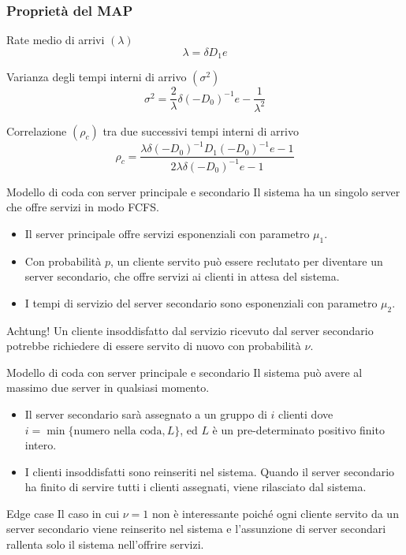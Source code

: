 \documentclass{beamer}
\begin{document}
\begin{frame}
    \frametitle{Proprietà del MAP}
        \begin{block}{Rate medio di arrivi $(\lambda)$}
            $$ \lambda = \delta D_1 e$$
        \end{block}
        \begin{block}{Varianza degli tempi interni di arrivo $(\sigma^2)$}
            $$ \sigma^2 = \frac{2}{\lambda} \delta (-D_0)^{-1} e - \frac{1}{\lambda^2}$$
        \end{block}
        \begin{block}{Correlazione $(\rho_c)$ tra due successivi tempi interni di arrivo}
            $$ \rho_c = \frac{\lambda \delta (-D_0)^{-1} D_1 (-D_0)^{-1} e - 1}{2 \lambda \delta (-D_0)^{-1} e - 1}$$
        \end{block}
\end{frame}

\begin{frame}{Modello di coda con server principale e secondario}
    Il sistema ha un singolo server che offre servizi in modo FCFS.
    \begin{itemize}
        \item Il server principale offre servizi esponenziali con parametro $\mu_1$.
        \item  Con probabilità $p$, un cliente servito può essere reclutato per diventare un server secondario, che offre servizi ai clienti in attesa del sistema.
        \item I tempi di servizio del server secondario sono esponenziali con parametro $\mu_2$.
    \end{itemize}
    \begin{block}{Achtung!}
        Un cliente insoddisfatto dal servizio ricevuto dal server secondario potrebbe richiedere di essere servito di nuovo con probabilità $\nu$.
    \end{block}
\end{frame}


\begin{frame}{Modello di coda con server principale e secondario}
    Il sistema può avere al massimo due server in qualsiasi momento.
    \begin{itemize}
        \item Il server secondario sarà assegnato a un gruppo di $i$ clienti dove $i = \min \{\text{numero nella coda}, L\}$, ed $L$ è un pre-determinato positivo finito intero.
        \item I clienti insoddisfatti sono reinseriti nel sistema. Quando il server secondario ha finito di servire tutti i clienti assegnati, viene rilasciato dal sistema.
    \end{itemize}
    \begin{block}{Edge case}
        Il caso in cui $\nu = 1$ non è interessante poiché ogni cliente servito da un server secondario viene reinserito nel sistema e l'assunzione di server secondari rallenta solo il sistema nell'offrire servizi.
    \end{block}
\end{frame}
\end{document}
